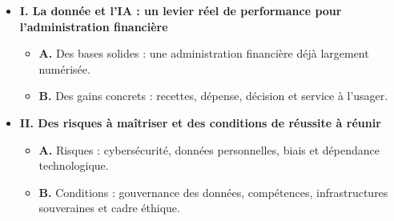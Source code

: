 \begin{itemize}
    \item \textbf{I. La donnée et l'IA : un levier réel de performance pour l'administration financière}
    \begin{itemize}
        \item \textbf{A.} Des bases solides : une administration financière déjà largement numérisée.
        \item \textbf{B.} Des gains concrets : recettes, dépense, décision et service à l'usager.
    \end{itemize}
    \item \textbf{II. Des risques à maîtriser et des conditions de réussite à réunir}
    \begin{itemize}
        \item \textbf{A.} Risques : cybersécurité, données personnelles, biais et dépendance technologique.
        \item \textbf{B.} Conditions : gouvernance des données, compétences, infrastructures souveraines et cadre éthique.
    \end{itemize}
\end{itemize}

